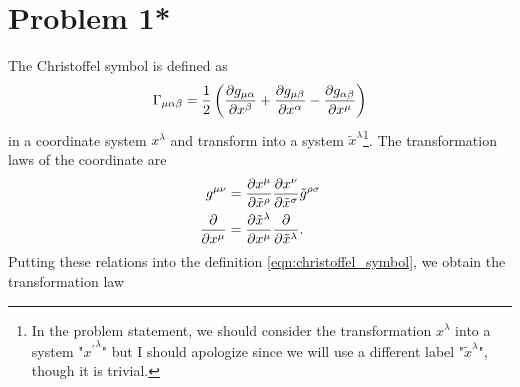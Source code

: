 \documentclass[a4paper,pdftex,10pt]{article}
\begin{document}
\maketitle

\tableofcontents

\clearpage
\section{Problem 1*}

The Christoffel symbol is defined as
\begin{equation}
  \Gamma_{\mu\alpha\beta}
  =
  \frac{1}{2}
  \left(
  \pdv{g_{\mu\alpha}}{x^{\beta}}
  +
  \pdv{g_{\mu\beta}}{x^{\alpha}}
  -
  \pdv{g_{\alpha\beta}}{x^{\mu}}
  \right)
  \label{eqn:christoffel_symbol}
\end{equation}
in a coordinate system $x^{\lambda}$ and transform into a system $\tilde{x}^{\lambda}$\footnote{
  In the problem statement, we should consider the transformation $x^{\lambda}$ into a system "${x^{\prime}}^{\lambda}$" but I should apologize since we will use a different label "$\tilde{x}^{\lambda}$", though it is trivial.
}. The transformation laws of the coordinate are
\begin{align}
  g^{\mu\nu}
   & =
  \pdv{x^{\mu}}{\tilde{x}^{\rho}}\pdv{x^{\nu}}{\tilde{x}^{\sigma}}\tilde{g}^{\rho\sigma}
  \\
  \pdv{}{x^{\mu}}
   & =
  \pdv{\tilde{x}^{\lambda}}{x^{\mu}}\pdv{}{\tilde{x}^{\lambda}}  .
\end{align}
Putting these relations into the definition \eqref{eqn:christoffel_symbol}, we obtain the transformation law
\end{document}
